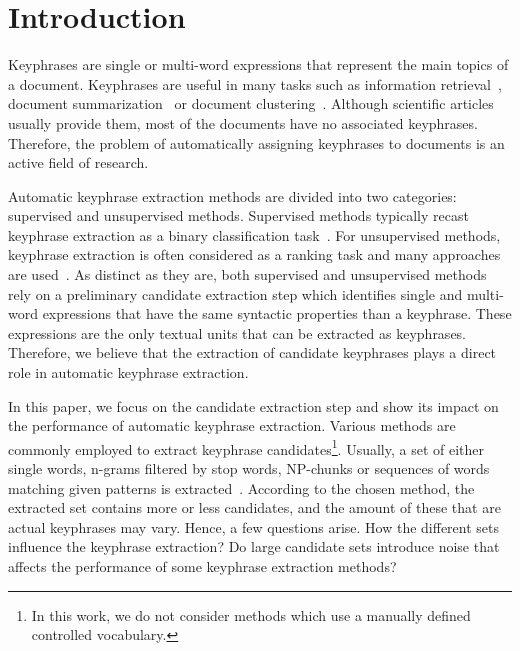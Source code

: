 \section{Introduction}
\label{sec:section}
  Keyphrases are single or multi-word expressions that represent the main topics
  of a document. Keyphrases are useful in many tasks such as information
  retrieval~\cite{medelyan2008smalltrainingset}, document
  summarization~\cite{litvak2008graphbased} or document
  clustering~\cite{han2007webdocumentclustering}. Although scientific articles
  usually provide them, most of the documents have no associated keyphrases.
  Therefore, the problem of automatically assigning keyphrases to documents is
  an active field of research.

  Automatic keyphrase extraction methods are divided into two categories:
  supervised and unsupervised methods. Supervised methods typically recast
  keyphrase extraction as a binary classification
  task~\cite{witten1999kea,sujian2003maximumentropy,eichler2010keywe}. For
  unsupervised methods, keyphrase extraction is often considered as a ranking
  task and many approaches are
  used~\cite{barker2000nounphrasehead,mihalcea2004textrank}. As distinct as they
  are, both supervised and unsupervised methods rely on a preliminary candidate
  extraction step which identifies single and multi-word expressions that have
  the same syntactic properties than a keyphrase. These expressions are the only
  textual units that can be extracted as keyphrases. Therefore, we believe that
  the extraction of candidate keyphrases plays a direct role in automatic
  keyphrase extraction.
  
  In this paper, we focus on the candidate extraction step and show its impact
  on the performance of automatic keyphrase extraction. Various methods
  are commonly employed to extract keyphrase candidates\footnote{In this work,
  we do not consider methods which use a manually defined controlled
  vocabulary.}. Usually, a set of either single words, n-grams filtered by stop
  words, NP-chunks or sequences of words matching given patterns is
  extracted~\cite{hulth2003keywordextraction}. According to the chosen method,
  the extracted set contains more or less candidates, and the amount of these
  that are actual keyphrases may vary. Hence, a few questions arise. How the
  different sets influence the keyphrase extraction? Do large candidate sets
  introduce noise that affects the performance of some keyphrase extraction
  methods?

